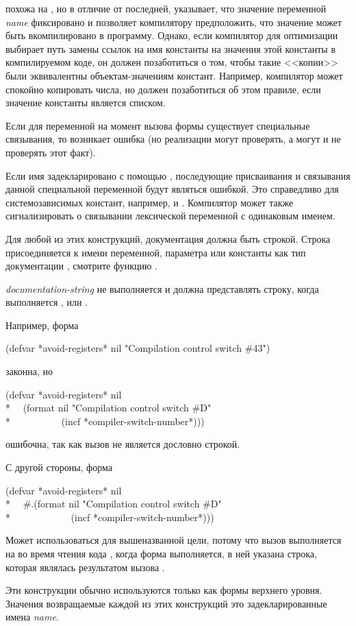 \begin{defmac}
 похожа на , но в отличие от последней,
указывает, что значение переменной \emph{name} фиксировано и позволяет
компилятору предположить, что значение может быть вкомпилировано в
программу. Однако, если компилятор  для оптимизации выбирает путь замены ссылок
на имя константы на значения этой константы в компилируемом коде, он должен
позаботиться о том, чтобы такие <<копии>> были эквивалентны 
объектам-значениям констант. Например, компилятор может спокойно копировать
числа, но должен позаботиться об этом правиле, если значение константы
является списком.

Если для переменной на момент вызова формы  существует
специальные связывания, то возникает ошибка (но реализации могут проверять, а
могут и не проверять этот факт).

Если имя задекларировано с помощью ,
последующие присваивания и связывания данной специальной переменной будут
являться ошибкой. Это справедливо для системозависимых констант, например,
 и .
Компилятор может также сигнализировать о связывании лексической переменной с
одинаковым именем.

Для любой из этих конструкций, документация должна быть строкой. Строка
присоединяется к имени переменной, параметра или константы как тип документации
, смотрите функцию .

\emph{documentation-string}
не выполняется и должна представлять строку, когда выполняется ,
 или .

Например, форма
\begin{lisp}
(defvar *avoid-registers* nil "Compilation control switch \#43")
\end{lisp}
законна, но
\begin{lisp}
(defvar *avoid-registers* nil \\*
~~(format nil "Compilation control switch \#{\Xtilde}D" \\*
~~~~~~~~~~(incf *compiler-switch-number*)))
\end{lisp}
ошибочна, так как вызов  не является дословно строкой.

С другой стороны, форма
\begin{lisp}
(defvar *avoid-registers* nil \\*
~~\#.(format nil "Compilation control switch \#{\Xtilde}D" \\*
~~~~~~~~~~~~(incf *compiler-switch-number*)))
\end{lisp}
Может использоваться для вышеназванной цели, потому что вызов 
выполняется на во время чтения кода , когда форма 
выполняется, в ней указана строка, которая являлась результатом вызова
.

Эти конструкции обычно используются только как формы верхнего уровня. Значения
возвращаемые каждой из этих конструкций это задекларированные имена \emph{name}.
\end{defmac}

